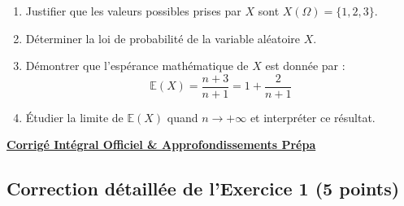 \documentclass[11pt,a4paper]{article}
\newcommand{\E}{\mathbb{E}}
\begin{document}
\begin{enumerate}
    \item Justifier que les valeurs possibles prises par $X$ sont $X(\Omega) = \{1, 2, 3\}$.
    \item Déterminer la loi de probabilité de la variable aléatoire $X$.
    \item Démontrer que l'espérance mathématique de $X$ est donnée par :
    \[
    \E(X) = \frac{n + 3}{n + 1} = 1 + \frac{2}{n + 1}
    \]
    \item Étudier la limite de $\E(X)$ quand $n \to +\infty$ et interpréter ce résultat.
\end{enumerate}

\newpage

\begin{center}
    {\Large \bfseries \color{emeraldtitle} \underline{Corrigé Intégral Officiel \& Approfondissements Prépa}}
\end{center}

\vspace{0.3cm}

\subsection*{Correction détaillée de l'Exercice 1 \hfill (5 points)}
\end{document}
